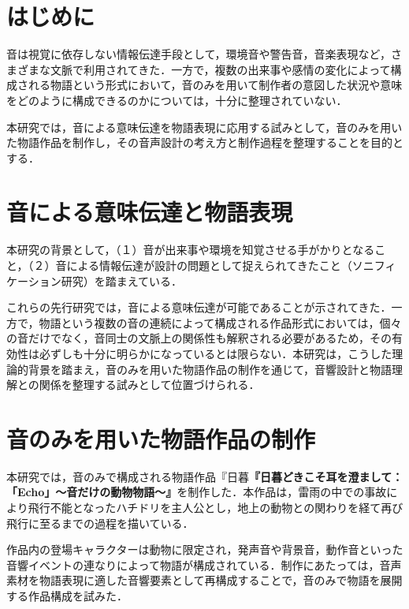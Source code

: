 

\section{はじめに}
音は視覚に依存しない情報伝達手段として，環境音や警告音，音楽表現など，さまざまな文脈で利用されてきた．一方で，複数の出来事や感情の変化によって構成される物語という形式において，音のみを用いて制作者の意図した状況や意味をどのように構成できるのかについては，十分に整理されていない．

本研究では，音による意味伝達を物語表現に応用する試みとして，音のみを用いた物語作品を制作し，その音声設計の考え方と制作過程を整理することを目的とする．

\section{音による意味伝達と物語表現}
本研究の背景として，（１）音が出来事や環境を知覚させる手がかりとなること\cite{gaver_what_1993}，（２）音による情報伝達が設計の問題として捉えられてきたこと（ソニフィケーション研究\cite{hermann_taxonomy_2008,kramer_sonification_nodate}）を踏まえている．

これらの先行研究では，音による意味伝達が可能であることが示されてきた．一方で，物語という複数の音の連続によって構成される作品形式においては，個々の音だけでなく，音同士の文脈上の関係性も解釈される必要があるため，その有効性は必ずしも十分に明らかになっているとは限らない．本研究は，こうした理論的背景を踏まえ，音のみを用いた物語作品の制作を通じて，音響設計と物語理解との関係を整理する試みとして位置づけられる．

\section{音のみを用いた物語作品の制作}

本研究では，音のみで構成される物語作品『日暮\textbf{『日暮どきこそ耳を澄まして：「Echo」～音だけの動物物語～』}を制作した．本作品は，雷雨の中での事故により飛行不能となったハチドリを主人公とし，地上の動物との関わりを経て再び飛行に至るまでの過程を描いている．

作品内の登場キャラクターは動物に限定され，発声音や背景音，動作音といった音響イベントの連なりによって物語が構成されている．制作にあたっては，音声素材を物語表現に適した音響要素として再構成することで，音のみで物語を展開する作品構成を試みた．

